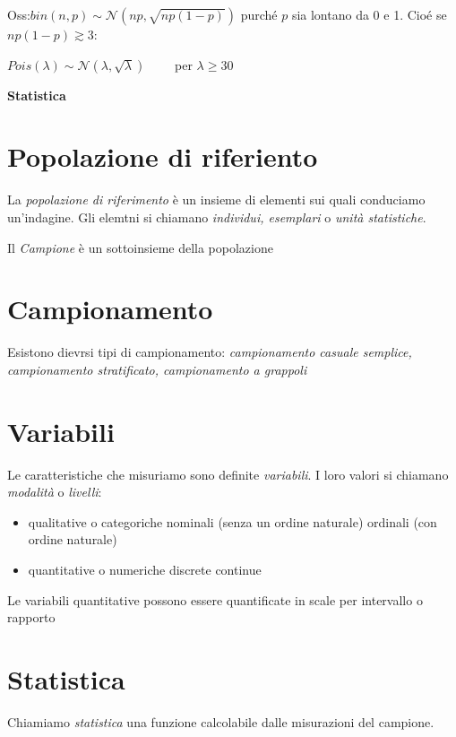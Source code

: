 \documentclass[11pt, letterpaper]{article}
\begin{document}
Oss:$bin(n,p)\sim\mathcal{N}(np,\sqrt{np(1-p)})$ purché $p$ sia lontano da 0 e 1. Cioé se $np(1-p)\gtrsim 3$:
\begin{center}
    $Pois(\lambda)\sim\mathcal{N}(\lambda,\sqrt\lambda)\qquad$ per $\lambda\geq 30$
\end{center}

\newpage
\thispagestyle{fancy}

\begin{center}
    \textbf{Statistica}
\end{center}

\section{Popolazione di riferiento}
La \textit{popolazione di riferimento} è un insieme di elementi sui quali conduciamo un'indagine. Gli elemtni si
chiamano \textit{individui, esemplari} o \textit{unità statistiche}.

Il \textit{Campione} è un sottoinsieme della popolazione

\section{Campionamento}
Esistono dievrsi tipi di campionamento: \textit{campionamento casuale semplice, campionamento stratificato, 
campionamento a grappoli}

\section{Variabili}
Le caratteristiche che misuriamo sono definite \textit{variabili}. I loro valori si chiamano \textit{modalità} o
\textit{livelli}:
\begin{itemize}
    \item qualitative o categoriche
    \subitem nominali (senza un ordine naturale)
    \subitem ordinali (con ordine naturale)
    \item quantitative o numeriche
    \subitem discrete
    \subitem continue
\end{itemize}
Le variabili quantitative possono essere quantificate in scale per intervallo o rapporto

\section{Statistica}
Chiamiamo \textit{statistica} una funzione calcolabile dalle misurazioni del campione.
\end{document}
